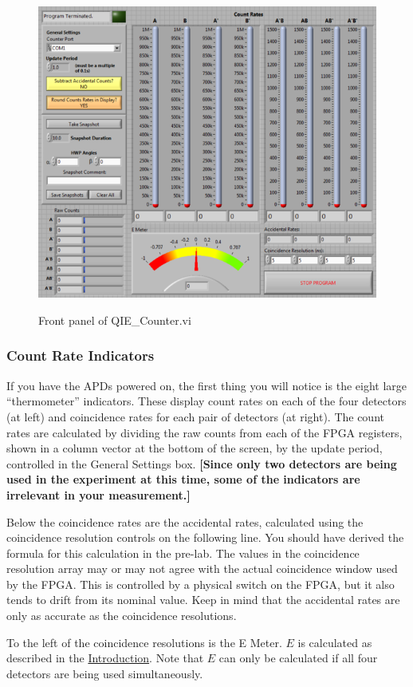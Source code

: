 \documentclass{../lab}
\begin{document}
\begin{figure}[h]
    \centering
    \href{http://experimentationlab.berkeley.edu/sites/default/files/images/600px-QIE_LabVIEW.png}{\includegraphics[width=0.5\linewidth]{images/600px-QIE_LabVIEW.png}}
    \caption{Front panel of QIE\_Counter.vi}
    \label{fig:600px-QIE_LabVIEW}
\end{figure}

\subsubsection{Count Rate Indicators}

If you have the APDs powered on, the first thing you will notice is the eight large ``thermometer'' indicators. These display count rates on each of the four detectors (at left) and coincidence rates for each pair of detectors (at right). The count rates are calculated by dividing the raw counts from each of the FPGA registers, shown in a column vector at the bottom of the screen, by the update period, controlled in the General Settings box. \textbf{[Since only two detectors are being used in the experiment at this time, some of the indicators are irrelevant in your measurement.]}

Below the coincidence rates are the accidental rates, calculated using the coincidence resolution controls on the following line. You should have derived the formula for this calculation in the pre-lab. The values in the coincidence resolution array may or may not agree with the actual coincidence window used by the FPGA. This is controlled by a physical switch on the FPGA, but it also tends to drift from its nominal value. Keep in mind that the accidental rates are only as accurate as the coincidence resolutions.

To the left of the coincidence resolutions is the E Meter. $E$ is calculated as described in the \hyperref[sec:Introduction]{Introduction}. Note that $E$ can only be calculated if all four detectors are being used simultaneously.
\end{document}
